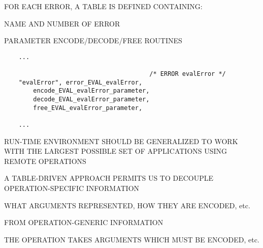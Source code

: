 \begin{bwslide}

\begin{nrtc}
\item	FOR EACH ERROR, A TABLE IS DEFINED CONTAINING:
    \begin{nrtc}
    \item	NAME AND NUMBER OF ERROR

    \item	PARAMETER ENCODE/DECODE/FREE ROUTINES
    \end{nrtc}
\end{nrtc}\small

\begin{verbatim}
    ...

                                        /* ERROR evalError */
    "evalError", error_EVAL_evalError,
        encode_EVAL_evalError_parameter,
        decode_EVAL_evalError_parameter,
        free_EVAL_evalError_parameter,

    ...
\end{verbatim}
\end{bwslide}


\begin{bwslide}

\begin{nrtc}
\item	RUN-TIME ENVIRONMENT SHOULD BE GENERALIZED TO WORK WITH THE LARGEST
	POSSIBLE SET OF APPLICATIONS USING REMOTE OPERATIONS

\item	A TABLE-DRIVEN APPROACH PERMITS US TO DECOUPLE OPERATION-SPECIFIC
	INFORMATION
    \begin{nrtc}
    \item	WHAT ARGUMENTS REPRESENTED, HOW THEY ARE ENCODED, etc.
    \end{nrtc}
	FROM OPERATION-GENERIC INFORMATION
    \begin{nrtc}
    \item	THE OPERATION TAKES ARGUMENTS WHICH MUST BE ENCODED, etc.
    \end{nrtc}
\end{nrtc}
\end{bwslide}


